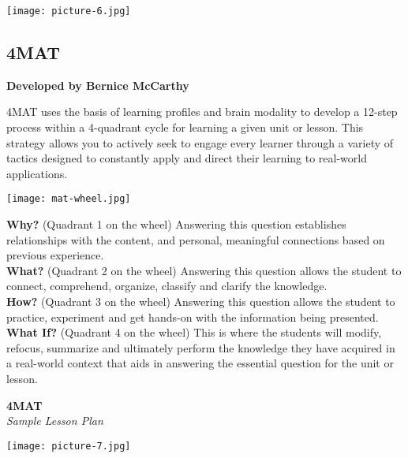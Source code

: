 \begin{center}
\texttt{[image: picture-6.jpg]} 
\end{center}

\newpage
\begin{center}
\section{4MAT}
\textbf{Developed by Bernice McCarthy}\\
\end{center}


4MAT uses the basis of learning profiles and brain modality to develop a 12-step process within a 4-quadrant cycle for learning a given unit or lesson.  This strategy allows you to actively seek to engage every learner through a variety of tactics designed to constantly apply and direct their learning to real-world applications.


\begin{center}
\texttt{[image: mat-wheel.jpg]} 
\end{center}

\begin{flushleft}
\textbf{Why?} (Quadrant 1 on the wheel)
Answering this question establishes relationships with the content, and personal, meaningful connections based on previous experience.\\

\textbf{What?} (Quadrant 2 on the wheel)
Answering this question allows the student to connect, comprehend, organize, classify and clarify the knowledge.\\

\textbf{How?} (Quadrant 3 on the wheel)
Answering this question allows the student to practice, experiment and get hands-on with the information being presented.\\

\textbf{What If?} (Quadrant 4 on the wheel)
This is where the students will modify, refocus, summarize and ultimately perform the knowledge they have acquired in a real-world context that aids in answering the essential question for the unit or lesson.\\

\end{flushleft}

\newpage
\begin{center}
\textbf{4MAT }\\
\textit{Sample Lesson Plan}
\end{center}

\begin{center}
\texttt{[image: picture-7.jpg]} 
\end{center}